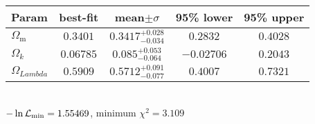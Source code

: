 \begin{tabular}{|l|c|c|c|c|} 
 \hline 
Param & best-fit & mean$\pm\sigma$ & 95\% lower & 95\% upper \\ \hline 
$\Omega_\mathrm{m}$ &$0.3401$ & $0.3417_{-0.034}^{+0.028}$ & $0.2832$ & $0.4028$ \\ 
$\Omega{}_{k }$ &$0.06785$ & $0.085_{-0.064}^{+0.053}$ & $-0.02706$ & $0.2043$ \\ 
$\Omega{}_{Lambda }$ &$0.5909$ & $0.5712_{-0.077}^{+0.091}$ & $0.4007$ & $0.7321$ \\ 
\hline 
 \end{tabular} \\ 
$-\ln{\cal L}_\mathrm{min} =1.55469$, minimum $\chi^2=3.109$ \\ 
